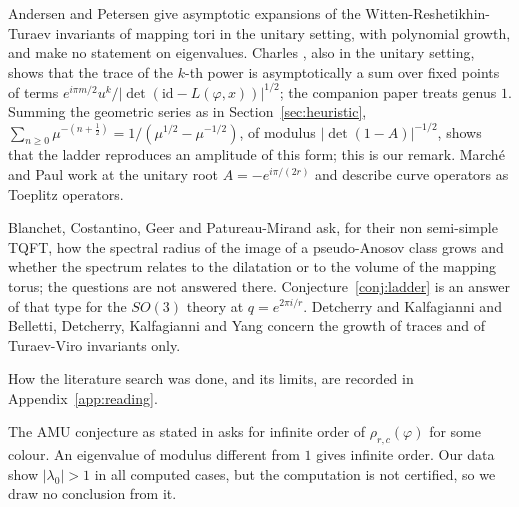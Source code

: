 \documentclass[11pt]{amsart}
\theoremstyle{definition}
\theoremstyle{remark}
\begin{document}
Andersen and Petersen \cite[Thms.~1.1--1.3]{AP} give asymptotic expansions of the
Witten-Reshetikhin-Turaev invariants of mapping tori in the unitary setting, with
polynomial growth, and make no statement on eigenvalues. Charles \cite[Thms.~2.5
and~2.6]{Cha}, also in the unitary setting, shows that the trace of the $k$-th power
is asymptotically a sum over fixed points of terms
$e^{i\pi m/2} u^k/|\det(\mathrm{id} - L(\varphi,x))|^{1/2}$; the companion paper
\cite[Thms.~1.1 and~9.8]{Cha2} treats genus $1$. Summing the geometric series as in
Section~\ref{sec:heuristic}, $\sum_{n\ge0}\mu^{-(n+\frac12)} =
1/(\mu^{1/2} - \mu^{-1/2})$, of modulus $|\det(1-A)|^{-1/2}$, shows that the ladder
reproduces an amplitude of this form; this is our remark. March\'e and Paul \cite{MP}
work at the unitary root $A = -e^{i\pi/(2r)}$ and describe curve operators as Toeplitz
operators.

Blanchet, Costantino, Geer and Patureau-Mirand \cite[Questions~1.7(2) and~6.14]{BCGP}
ask, for their non semi-simple TQFT, how the spectral radius of the image of a
pseudo-Anosov class grows and whether the spectrum relates to the dilatation or to
the volume of the mapping torus; the questions are not answered there.
Conjecture~\ref{conj:ladder} is an answer of that type for the $SO(3)$ theory at
$q = e^{2\pi i/r}$. Detcherry and Kalfagianni \cite[Conj.~1.3, Thms.~1.1 and~1.4,
Cor.~1.6]{DK2} and Belletti, Detcherry, Kalfagianni and Yang \cite[Thms.~1.2
and~1.4]{BDKY} concern the growth of traces and of Turaev-Viro invariants only.

How the literature search was done, and its limits, are recorded in
Appendix~\ref{app:reading}.

The AMU conjecture as stated in \cite[Conj.~1.1]{DK} asks for infinite order of
$\rho_{r,c}(\varphi)$ for some colour. An eigenvalue of modulus different from $1$
gives infinite order. Our data show $|\lambda_0| > 1$ in all computed cases, but the
computation is not certified, so we draw no conclusion from it.
\end{document}
